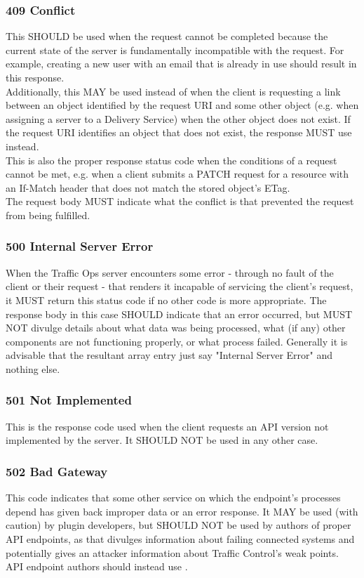 \subsubsection{409 Conflict}
This SHOULD be used when the request cannot be completed because the current state of the server is fundamentally incompatible with the request. For example,
creating a new user with an email that is already in use should result in this response.\\
Additionally, this MAY be used instead of  when the client is requesting a link between an object identified by the request URI and some
other object (e.g. when assigning a server to a Delivery Service) when the other object does not exist. If the request URI identifies an object that does not
exist, the response MUST use  instead.\\
This is also the proper response status code when the conditions of a request cannot be met, e.g. when a client submits a PATCH request for a resource with an
If-Match header that does not match the stored object's ETag.\\
The request body MUST indicate what the conflict is that prevented the request from being fulfilled.

\subsubsection{500 Internal Server Error}
When the Traffic Ops server encounters some error - through no fault of the client or their request - that renders it incapable of servicing the client's
request, it MUST return this status code if no other code is more appropriate. The response body in this case SHOULD indicate that an error occurred, but
MUST NOT divulge details about what data was being processed, what (if any) other components are not functioning properly, or what process failed. Generally
it is advisable that the resultant  array entry just say "Internal Server Error" and nothing else.

\subsubsection{501 Not Implemented}
This is the response code used when the client requests an API version not implemented by the server. It SHOULD NOT be used in any other case.

\subsubsection{502 Bad Gateway}
This code indicates that some other service on which the endpoint's processes depend has given back improper data or an error response. It MAY be used
(with caution) by plugin developers, but SHOULD NOT be used by authors of proper API endpoints, as that divulges information about failing connected systems
and potentially gives an attacker information about Traffic Control's weak points. API endpoint authors should instead use .


